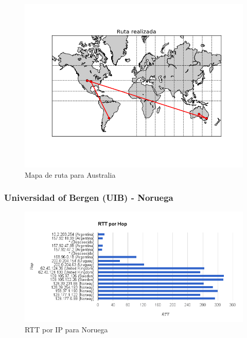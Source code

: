 \begin{figure}[H]
  \centering
    \includegraphics[width=1\textwidth]{../Experimentacion/Australia/map.png}
    \caption{Mapa de ruta para Australia}
  \label{map-aus}
\end{figure}

\subsubsection{Universidad of Bergen (UIB) - Noruega}

\begin{figure}[H]
  \centering
    \includegraphics[width=1\textwidth]{../Experimentacion/Noruega/rtt.png}
    \caption{RTT por IP para Noruega}
  \label{rtt-nor}
\end{figure}

